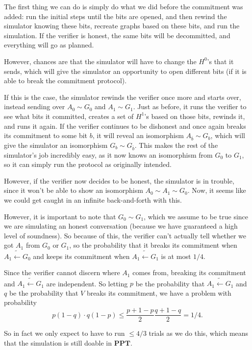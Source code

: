 \documentclass[11pt]{article}
\newcommand{\PPT}{\mathbf{PPT}}
\begin{document}
The first thing we can do is simply do what we did before the commitment was added: run the initial steps until the bits are opened, and then rewind the simulator knowing these bits, recreate graphs based on these bits, and run the simulation. If the verifier is honest, the same bits will be decommitted, and everything will go as planned.\medskip

However, chances are that the simulator will have to change the \(H^0\)'s that it sends, which will give the simulator an opportunity to open different bits (if it is able to break the commitment protocol). \smallskip

If this is the case, the simulator rewinds the verifier once more and starts over, instead sending over \(A_0\sim G_0\) and \(A_1\sim G_1\). Just as before, it runs the verifier to see what bits it committed, creates a set of \(H^1\)'s based on those bits, rewinds it, and runs it again. If the verifier continues to be dishonest and once again breaks its commitment to some bit \(b\), it will reveal an isomorphism \(A_{\overline{b}}\sim G_b\), which will give the simulator an isomorphism \(G_b\sim G_{\overline{b}}\). This makes the rest of the simulator's job incredibly easy, as it now knows an isomorphism from \(G_0\) to \(G_1\), so it can simply run the protocol as originally intended.\medskip

However, if the verifier now decides to be honest, the simulator is in trouble, since it won't be able to show an isomorphism \(A_0\sim A_1\sim G_0\). Now, it seems like we could get caught in an infinite back-and-forth with this.\smallskip

However, it is important to note that \(G_0\sim G_1\), which we assume to be true since we are simulating an honest conversation (because we have guaranteed a high level of soundness). So because of this, the verifier can't actually tell whether we got \(A_1\) from \(G_0\) or \(G_1\),  so the probability that it breaks its commitment when \(A_1\tilde{\gets} G_0\) and keeps its commitment when \(A_1\tilde{\gets} G_1\) is at most \(1/4\). \smallskip

Since the verifier cannot discern where \(A_1\) comes from, breaking its commitment and \(A_1\tilde{\gets} G_1\) are independent. So letting \(p\) be the probability that \(A_1\tilde{\gets} G_1\) and \(q\) be the probability that \(V\) breaks its commitment, we have a problem with probability
\[p(1-q)\cdot q(1-p) \le \frac{p+1-p}{2}\frac{q+1-q}{2} = 1/4.\]

So in fact we only expect to have to run \(\le 4/3\) trials as we do this, which means that the simulation is still doable in \(\PPT\).\bigskip
\end{document}
